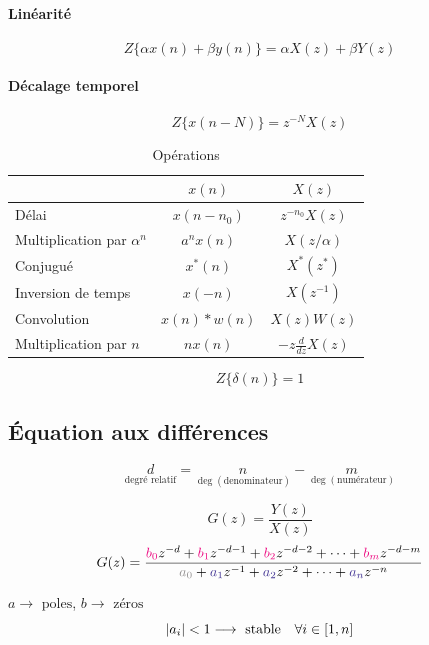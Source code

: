 \documentclass[resume]{subfiles}
\begin{document}
\paragraph{Linéarité}
$$Z\lbrace \alpha x(n)+\beta y(n)\rbrace=\alpha X(z)+\beta Y(z)$$
\paragraph{Décalage temporel}
$$Z\lbrace x(n-N)\rbrace=z^{-N}X(z)$$
\begin{table}[H]
\begin{tabular}{lcc}
 & $x(n)$ & $X(z)$\\\hline
Délai & $x(n-n_0)$ & $z^{-n_0}X(z)$\\
Multiplication par $\alpha^{n}$ & $a^{n}x(n)$ & $X(z/\alpha)$\\
Conjugué & $x^\ast(n)$ & $X^\ast(z^\ast)$\\
Inversion de temps & $x(-n)$ & $X(z^{-1})$\\
Convolution & $x(n)*w(n)$ & $X(z)W(z)$\\
Multiplication par $n$ & $nx(n)$ & $-z\frac{d}{dz}X(z)$
\end{tabular}
\caption{Opérations}
\end{table}
$$Z\lbrace\delta(n)\rbrace=1$$
\subsection{Équation aux différences}
$$\underset{\text{degré relatif}}{d}=\underset{\deg(\text{denominateur})}{n}-\underset{\deg(\text{numérateur})}{m}$$
\begin{small}
$$G(z)=\frac{Y(z)}{X(z)}$$
$$G(z)=\frac{\bcolor{b_0}z^{-d}+\bcolor{b_1}z^{-d-1}+\bcolor{b_2}z^{-d-2}+\cdots+\bcolor{b_m}z^{-d-m}}{\textcolor{Gray}{a_0}+\acolor{a_1}z^{-1}+\acolor{a_2}z^{-2}+\cdots+\acolor{a_n}z^{-n}}$$
\end{small}
$a\longrightarrow \text{ poles}$, $b\longrightarrow\text{ zéros}$
$$\abs{a_i}<1\longrightarrow\text{ stable}\quad \forall i\in [1,n]$$
\end{document}
